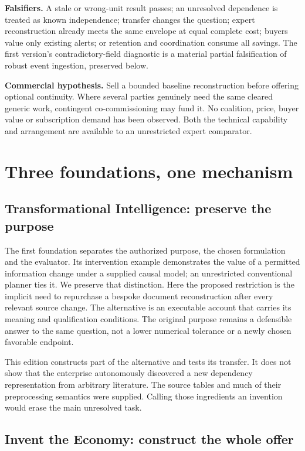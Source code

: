 \documentclass[11pt]{article}
\begin{document}
\textbf{Falsifiers.} A stale or wrong-unit result passes; an unresolved dependence is treated as known independence; transfer changes the question; expert reconstruction already meets the same envelope at equal complete cost; buyers value only existing alerts; or retention and coordination consume all savings. The first version's contradictory-field diagnostic is a material partial falsification of robust event ingestion, preserved below.

\textbf{Commercial hypothesis.} Sell a bounded baseline reconstruction before offering optional continuity. Where several parties genuinely need the same cleared generic work, contingent co-commissioning may fund it. No coalition, price, buyer value or subscription demand has been observed. Both the technical capability and arrangement are available to an unrestricted expert comparator.

\section{Three foundations, one mechanism}

\subsection{Transformational Intelligence: preserve the purpose}

The first foundation separates the authorized purpose, the chosen formulation and the evaluator. Its intervention example demonstrates the value of a permitted information change under a supplied causal model; an unrestricted conventional planner ties it. We preserve that distinction.\citep{ti} Here the proposed restriction is the implicit need to repurchase a bespoke document reconstruction after every relevant source change. The alternative is an executable account that carries its meaning and qualification conditions. The original purpose remains a defensible answer to the same question, not a lower numerical tolerance or a newly chosen favorable endpoint.

This edition constructs part of the alternative and tests its transfer. It does not show that the enterprise autonomously discovered a new dependency representation from arbitrary literature. The source tables and much of their preprocessing semantics were supplied. Calling those ingredients an invention would erase the main unresolved task.

\subsection{Invent the Economy: construct the whole offer}
\end{document}
